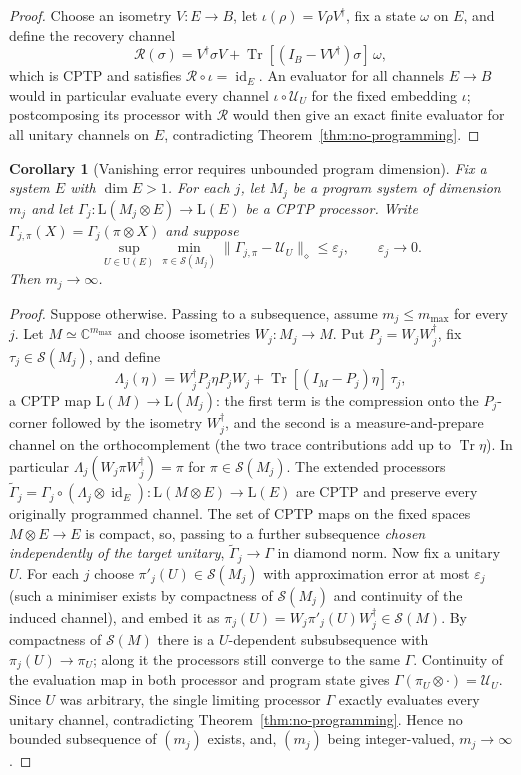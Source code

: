 \documentclass[11pt,a4paper]{article}
\newtheorem{corollary}[theorem]{Corollary}
\newcommand{\Lin}{\mathrm{L}}
\newcommand{\Sstate}{\mathcal{S}}
\newcommand{\Tr}{\operatorname{Tr}}
\newcommand{\id}{\operatorname{id}}
\begin{document}
\begin{proof}
Choose an isometry $V:E\to B$, let $\iota(\rho)=V\rho V^\dagger$, fix a state $\omega$ on $E$, and define the recovery channel
\[
\mathcal R(\sigma)=V^\dagger\sigma V+\Tr[(I_B-VV^\dagger)\sigma]\,\omega,
\]
which is CPTP and satisfies $\mathcal R\circ\iota=\id_E$. An evaluator for all channels $E\to B$ would in particular evaluate every channel $\iota\circ\mathcal U_U$ for the fixed embedding $\iota$; postcomposing its processor with $\mathcal R$ would then give an exact finite evaluator for all unitary channels on $E$, contradicting Theorem~\ref{thm:no-programming}.
\end{proof}

\begin{corollary}[Vanishing error requires unbounded program dimension]
\label{cor:divergence}
Fix a system $E$ with $\dim E>1$. For each $j$, let $M_j$ be a program system of dimension $m_j$ and let $\Gamma_j:\Lin(M_j\otimes E)\to\Lin(E)$ be a CPTP processor. Write $\Gamma_{j,\pi}(X)=\Gamma_j(\pi\otimes X)$ and suppose
\[
\sup_{U\in\mathrm U(E)}\min_{\pi\in\Sstate(M_j)}
\|\Gamma_{j,\pi}-\mathcal U_U\|_\diamond
\le\varepsilon_j,\qquad\varepsilon_j\longrightarrow0.
\]
Then $m_j\to\infty$.
\end{corollary}

\begin{proof}
Suppose otherwise. Passing to a subsequence, assume $m_j\le m_{\max}$ for every $j$. Let $M\simeq\mathbb C^{m_{\max}}$ and choose isometries $W_j:M_j\to M$. Put $P_j=W_jW_j^\dagger$, fix $\tau_j\in\Sstate(M_j)$, and define
\[
\Lambda_j(\eta)=W_j^\dagger P_j\eta P_jW_j+\Tr[(I_M-P_j)\eta]\,\tau_j,
\]
a CPTP map $\Lin(M)\to\Lin(M_j)$: the first term is the compression onto the $P_j$-corner followed by the isometry $W_j^\dagger$, and the second is a measure-and-prepare channel on the orthocomplement (the two trace contributions add up to $\Tr\eta$). In particular $\Lambda_j(W_j\pi W_j^\dagger)=\pi$ for $\pi\in\Sstate(M_j)$. The extended processors $\widetilde\Gamma_j=\Gamma_j\circ(\Lambda_j\otimes\id_E):\Lin(M\otimes E)\to\Lin(E)$ are CPTP and preserve every originally programmed channel. The set of CPTP maps on the fixed spaces $M\otimes E\to E$ is compact, so, passing to a further subsequence \emph{chosen independently of the target unitary}, $\widetilde\Gamma_j\to\Gamma$ in diamond norm. Now fix a unitary $U$. For each $j$ choose $\pi'_j(U)\in\Sstate(M_j)$ with approximation error at most $\varepsilon_j$ (such a minimiser exists by compactness of $\Sstate(M_j)$ and continuity of the induced channel), and embed it as $\pi_j(U)=W_j\pi'_j(U)W_j^\dagger\in\Sstate(M)$. By compactness of $\Sstate(M)$ there is a $U$-dependent subsubsequence with $\pi_j(U)\to\pi_U$; along it the processors still converge to the same $\Gamma$. Continuity of the evaluation map in both processor and program state gives $\Gamma(\pi_U\otimes\cdot)=\mathcal U_U$. Since $U$ was arbitrary, the single limiting processor $\Gamma$ exactly evaluates every unitary channel, contradicting Theorem~\ref{thm:no-programming}. Hence no bounded subsequence of $(m_j)$ exists, and, $(m_j)$ being integer-valued, $m_j\to\infty$.
\end{proof}
\end{document}
